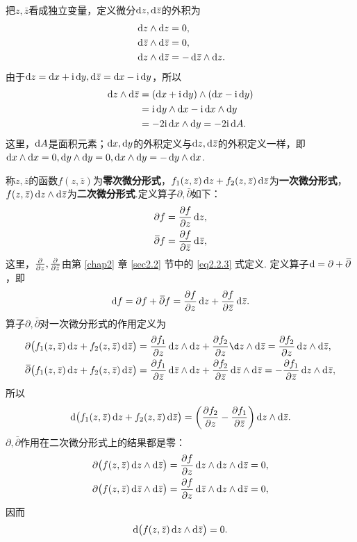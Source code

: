 把$z,\bar z$看成独立变量，定义微分$\dz,\dzz$的外积为
\begin{align*}
  & \dz\wedge \dz = 0,\\
  & \dzz\wedge \dzz = 0,\\
  & \dz\wedge \dzz = -\dzz\wedge \dz.
\end{align*}
由于$\dz=\dx+\ii\dy,\dzz=\dx-\ii\dy$，所以
\begin{align*}
  \dz\wedge\dzz & = (\dx+\ii\dy)\wedge(\dx-\ii\dy)\\
  & = \ii\dy\wedge\dx-\ii\dx\wedge\dy\\
  & = -2\ii\dx\wedge\dy = -2\ii\dif A.
\end{align*}
这里，$\dif A$是面积元素；$\dx,\dy$的外积定义与$\dz,\dzz$的外积定义一样，即$\dx\wedge\dx=0,\dy\wedge\dy=0,\dx\wedge\dy=-\dy\wedge\dx$.

称$z,\bar z$的函数$f(z,\bar z)$为\textbf{零次微分形式}，$f_1(z,\bar z)\dz+f_2(z,\bar z)\dzz$为\textbf{一次微分形式}，$f(z,\bar z)\dz\wedge\dzz$为\textbf{二次微分形式}.定义算子$\partial,\bar\partial$如下：
\begin{align*}
  & \partial f = \pp fz\dz,\\
  & \bar \partial f = \pp f{\bar z}\dzz,
\end{align*}
这里，$\pp{}z,\pp{}{\bar z}$由第 \ref{chap2} 章 \ref{sec2.2} 节中的 \eqref{eq2.2.3} 式定义. 定义算子$\dif =\partial+\bar\partial$，即
\begin{equation}\label{eq3.6.1}
  \dif f = \partial f + \bar\partial f = \pp fz\dz + \pp f{\bar z}\dzz.
\end{equation}
算子$\partial,\bar\partial$对一次微分形式的作用定义为
\begin{align*}
  \partial\big(f_1(z,\bar z)\dz+f_2(z,\bar z)\dzz\big)
  & = \pp{f_1}z\dz \wedge \dz + \pp{f_2}z \d z\wedge\dzz = \pp{f_2}z\dz \wedge \dzz,\\
  \bar\partial\big(f_1(z,\bar z)\dz+f_2(z,\bar z)\dzz\big)
  & = \pp{f_1}{\bar z}\dzz\wedge\dz+\pp{f_2}{\bar z}\dzz\wedge\dzz=-\pp{f_1}{\bar z}\dz\wedge\dzz,
\end{align*}
所以
\begin{equation}\label{eq3.6.2}
  \dif \big(f_1(z,\bar z)\dz + f_2(z,\bar z)\dzz\big)
  = \bigg(\pp{f_2}z-\pp{f_1}{\bar z}\bigg)\dz\wedge\dzz.
\end{equation}
$\partial,\bar\partial$作用在二次微分形式上的结果都是零：
\begin{align*}
  & \partial\big(f(z,\bar z)\dz\wedge\dzz\big) = \pp fz\dz\wedge\dz\wedge\dzz = 0,\\
  & \partial\big(f(z,\bar z)\dzz\wedge\dzz\big) = \pp fz\dzz\wedge\dz\wedge\dzz = 0,
\end{align*}
因而
\begin{equation}\label{eq3.6.3}
  \dif \big(f(z,\bar z)\dz\wedge\dzz\big)=0.
\end{equation}

